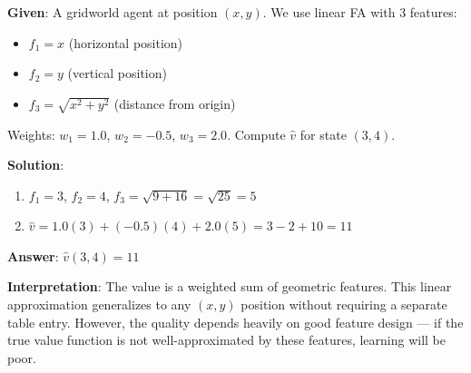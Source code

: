 \documentclass[11pt,a4paper]{article}
\begin{document}
\begin{tcolorbox}[colback=green!5!white,colframe=green!75!black,title=\textbf{Worked Example 41: Feature Design for Function Approximation}]
\textbf{Given}: A gridworld agent at position $(x, y)$. We use linear FA with 3 features:
\begin{itemize}
    \item $f_1 = x$ (horizontal position)
    \item $f_2 = y$ (vertical position)
    \item $f_3 = \sqrt{x^2 + y^2}$ (distance from origin)
\end{itemize}

\begin{center}
\end{center}

Weights: $w_1 = 1.0$, $w_2 = -0.5$, $w_3 = 2.0$. Compute $\hat{v}$ for state $(3, 4)$.

\textbf{Solution}:
\begin{enumerate}
    \item $f_1 = 3$, $f_2 = 4$, $f_3 = \sqrt{9 + 16} = \sqrt{25} = 5$
    \item $\hat{v} = 1.0(3) + (-0.5)(4) + 2.0(5) = 3 - 2 + 10 = 11$
\end{enumerate}

\textbf{Answer}: $\hat{v}(3, 4) = 11$

\textbf{Interpretation}: The value is a weighted sum of geometric features. This linear approximation generalizes to any $(x, y)$ position without requiring a separate table entry. However, the quality depends heavily on good feature design --- if the true value function is not well-approximated by these features, learning will be poor.
\end{tcolorbox}
\end{document}
